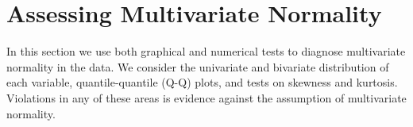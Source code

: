
\section{Assessing Multivariate Normality}

In this section we use both graphical and numerical tests to diagnose multivariate normality in the data. We consider the univariate and bivariate distribution of each variable, quantile-quantile (Q-Q) plots, and tests on skewness and kurtosis. Violations in any of these areas is evidence against the assumption of multivariate normality.





